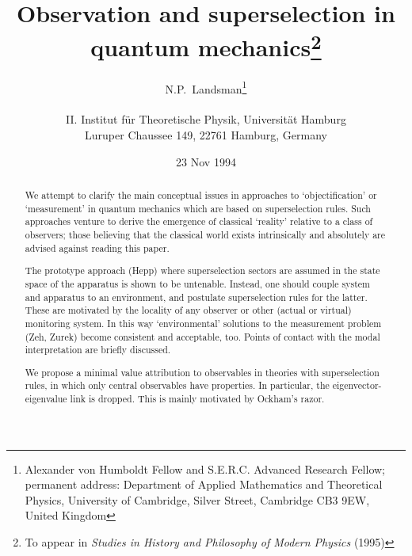 \documentclass[12pt,titlepage]{article}
\date{23 Nov 1994}
\begin{document}
\title{Observation and superselection in quantum mechanics\thanks{To appear in
{\em Studies in
History and Philosophy of Modern Physics} (1995)}} \author{
N.P.~Landsman\thanks{Alexander von
Humboldt Fellow and  S.E.R.C. Advanced Research Fellow; permanent address:
Department of Applied
Mathematics and Theoretical Physics, University of Cambridge, Silver Street,
Cambridge CB3 9EW, United Kingdom}\\ \mbox{}\hfill \\ II. Institut f\"{u}r
Theoretische Physik,
Universit\"{a}t Hamburg\\ Luruper Chaussee 149, 22761 Hamburg, Germany }
\maketitle
\begin{abstract}
We attempt to clarify the main conceptual issues in approaches to
`objectification' or `measurement'
in quantum mechanics which are based on superselection rules.
Such approaches  venture to derive the emergence of classical `reality'
relative to a class of observers; those believing that the classical world
exists intrinsically and
absolutely are advised against reading this paper.

The prototype approach (Hepp) where superselection sectors are assumed in the
state space of the
apparatus is shown to be untenable. Instead, one should couple system and
apparatus to an environment,
and postulate superselection rules for the latter. These are motivated by the
locality of any
observer or other (actual or virtual) monitoring system. In this way
`environmental' solutions to
the measurement problem (Zeh, Zurek) become consistent and acceptable, too.
Points of contact with
the modal interpretation are briefly discussed.

We propose a minimal value attribution to observables  in theories with
superselection rules,
 in which only central   observables have properties.
In particular, the eigenvector-eigenvalue link is dropped. This is mainly
motivated by Ockham's
razor.
 \end{abstract}
 \newpage
\end{document}
